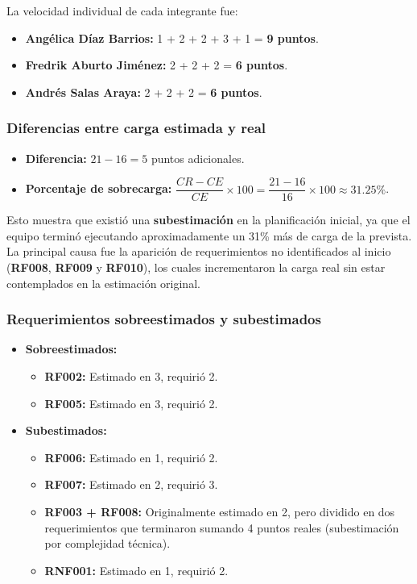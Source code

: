 La velocidad individual de cada integrante fue:

\begin{itemize}
    \item \textbf{Angélica Díaz Barrios:} 1 + 2 + 2 + 3 + 1 = \textbf{9 puntos}.
    \item \textbf{Fredrik Aburto Jiménez:} 2 + 2 + 2 = \textbf{6 puntos}.
    \item \textbf{Andrés Salas Araya:} 2 + 2 + 2 = \textbf{6 puntos}.
\end{itemize}


\bigskip

\subsubsection*{Diferencias entre carga estimada y real}

\begin{itemize}
    \item \textbf{Diferencia:} $21 - 16 = 5$ puntos adicionales.
    \item \textbf{Porcentaje de sobrecarga:} $\dfrac{CR - CE}{CE} \times 100 = \dfrac{21 - 16}{16} \times 100 \approx 31.25\%$.
\end{itemize}

Esto muestra que existió una \textbf{subestimación} en la planificación inicial, ya que el equipo terminó ejecutando aproximadamente un 31\% más de carga de la prevista. La principal causa fue la aparición de requerimientos no identificados al inicio (\textbf{RF008}, \textbf{RF009} y \textbf{RF010}), los cuales incrementaron la carga real sin estar contemplados en la estimación original.

\bigskip

\subsubsection*{Requerimientos sobreestimados y subestimados}

\begin{itemize}
    \item \textbf{Sobreestimados:}
        \begin{itemize}
            \item \textbf{RF002:} Estimado en 3, requirió 2.
            \item \textbf{RF005:} Estimado en 3, requirió 2.
        \end{itemize}

    \item \textbf{Subestimados:}
        \begin{itemize}
            \item \textbf{RF006:} Estimado en 1, requirió 2.
            \item \textbf{RF007:} Estimado en 2, requirió 3.
            \item \textbf{RF003 + RF008:} Originalmente estimado en 2, pero dividido en dos requerimientos que terminaron sumando 4 puntos reales (subestimación por complejidad técnica).
            \item \textbf{RNF001:} Estimado en 1, requirió 2.
        \end{itemize}
\end{itemize}

